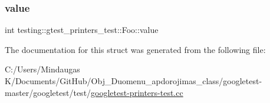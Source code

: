 \subsubsection{\texorpdfstring{value}{value}}
{\footnotesize\ttfamily int testing\+::gtest\+\_\+printers\+\_\+test\+::\+Foo\+::value}



The documentation for this struct was generated from the following file\+:\begin{DoxyCompactItemize}
\item 
C\+:/\+Users/\+Mindaugas K/\+Documents/\+Git\+Hub/\+Obj\+\_\+\+Duomenu\+\_\+apdorojimas\+\_\+class/googletest-\/master/googletest/test/\mbox{\hyperlink{googletest-master_2googletest_2test_2googletest-printers-test_8cc}{googletest-\/printers-\/test.\+cc}}\end{DoxyCompactItemize}
